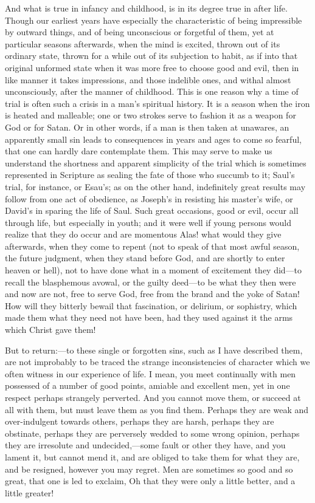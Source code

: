 And what is true in infancy and childhood, is in its degree true in
after life. Though our earliest years have especially the
characteristic of being impressible by outward things, and of being
unconscious or forgetful of them, yet at particular seasons
afterwards, when the mind is excited, thrown out of its ordinary
state, thrown for a while out of its subjection to habit, as if into
that original unformed state when it was more free to choose good and
evil, then in like manner it takes impressions, and those indelible
ones, and withal almost unconsciously, after the manner of childhood.
This is one reason why a time of trial is often such a crisis in a
man's spiritual history. It is a season when the iron is heated and
malleable; one or two strokes serve to fashion it as a weapon for God
or for Satan. Or in other words, if a man is then taken at unawares,
an apparently small sin leads to consequences in years and ages to
come so fearful, that one can hardly dare contemplate them. This may
serve to make us understand the shortness and apparent simplicity of
the trial which is sometimes represented in Scripture as sealing the
fate of those who succumb to it; Saul's trial, for instance, or
Esau's; as on the other hand, indefinitely great results may follow
from one act of obedience, as Joseph's in resisting his master's wife,
or David's in sparing the life of Saul. Such great occasions, good or
evil, occur all through life, but especially in youth; and it were
well if young persons would realize that they do occur and are
momentous Alas! what would they give afterwards, when they come to
repent (not to speak of that most awful season, the future judgment,
when they stand before God, and are shortly to enter heaven or hell),
not to have done what in a moment of excitement they did—to recall
the blasphemous avowal, or the guilty deed—to be what they then were
and now are not, free to serve God, free from the brand and the yoke
of Satan! How will they bitterly bewail that fascination, or delirium,
or sophistry, which made them what they need not have been, had they
used against it the arms which Christ gave them!

But to return:—to these single or forgotten sins, such as I have
described them, are not improbably to be traced the strange
inconsistencies of character which we often witness in our experience
of life. I mean, you meet continually with men possessed of a number
of good points, amiable and excellent men, yet in one respect perhaps
strangely perverted. And you cannot move them, or succeed at all with
them, but must leave them as you find them. Perhaps they are weak and
over-indulgent towards others, perhaps they are harsh, perhaps they
are obstinate, perhaps they are perversely wedded to some wrong
opinion, perhaps they are irresolute and undecided,—some fault or
other they have, and you lament it, but cannot mend it, and are
obliged to take them for what they are, and be resigned, however you
may regret. Men are sometimes so good and so great, that one is led to
exclaim, Oh that they were only a little better, and a little greater!

